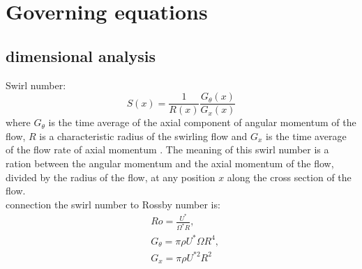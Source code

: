 \documentclass{article}
\begin{document}
\section{Governing equations}

\subsection{dimensional analysis}
Swirl number:
\begin{equation}
    S(x)=\frac{1}{R(x)}\frac{G_\theta(x)}{G_x(x)}
\end{equation}
where $G_\theta$ is the time average of the axial component of angular momentum of the flow, 
$R$ is a characteristic radius of the swirling flow and %
$G_x$ is the time average of the flow  rate of axial momentum \cite{vignat_suitability_2022}.
The meaning of this swirl number is a ration between the angular momentum and the axial momentum
 of the flow, divided by the radius of the flow, at any position $x$ along the cross section of the flow.\\

 connection the swirl number to Rossby number is:
\begin{align}
&Ro=\frac{U^*}{\Omega^*R} ,\\
&G_\theta=\pi\rho U^*\Omega R^4,\\
&G_x=\pi\rho U^{*2}R^2
\end{align}

 
\end{document}
